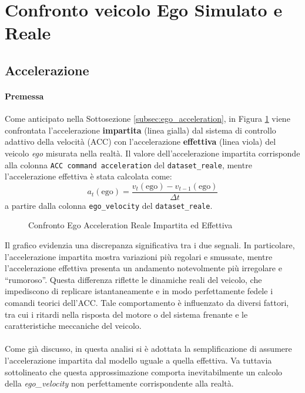 \section{Confronto veicolo Ego Simulato e Reale}
\subsection{Accelerazione}
\paragraph{Premessa}
Come anticipato nella Sottosezione \ref{subsec:ego_acceleration}, in Figura \ref{fig:acceleration_effettiva_impartita} 
viene confrontata l'accelerazione \textbf{impartita} (linea gialla) dal sistema di controllo adattivo della velocità (ACC) 
con l'accelerazione \textbf{effettiva} (linea viola) del veicolo \emph{ego} misurata nella realtà.  
Il valore dell'accelerazione impartita corrisponde alla colonna \texttt{ACC command acceleration} del \texttt{dataset\_reale}, 
mentre l'accelerazione effettiva è stata calcolata come:
\[
a_t(\mathrm{ego}) = \frac{v_t(\mathrm{ego}) - v_{t-1}(\mathrm{ego})}{\Delta t}
\]
a partire dalla colonna \texttt{ego\_velocity} del \texttt{dataset\_reale}.
\begin{figure}[H]
    \centering
    \caption{Confronto Ego Acceleration Reale Impartita ed Effettiva}
    \label{fig:acceleration_effettiva_impartita}
\end{figure}
\noindent Il grafico evidenzia una discrepanza significativa tra i due segnali.  
In particolare, l'accelerazione impartita mostra variazioni più regolari e smussate, mentre l'accelerazione effettiva presenta un andamento 
notevolmente più irregolare e “rumoroso”.  
Questa differenza riflette le dinamiche reali del veicolo, che impediscono di replicare istantaneamente e in modo perfettamente fedele 
i comandi teorici dell'ACC.  
Tale comportamento è influenzato da diversi fattori, tra cui i ritardi nella risposta del motore o del sistema frenante 
e le caratteristiche meccaniche del veicolo.
\\\\
\noindent Come già discusso, in questa analisi si è adottata la semplificazione di assumere l'accelerazione impartita dal modello 
uguale a quella effettiva.  
Va tuttavia sottolineato che questa approssimazione comporta inevitabilmente un calcolo della \emph{ego\_velocity} non perfettamente corrispondente alla realtà.  
